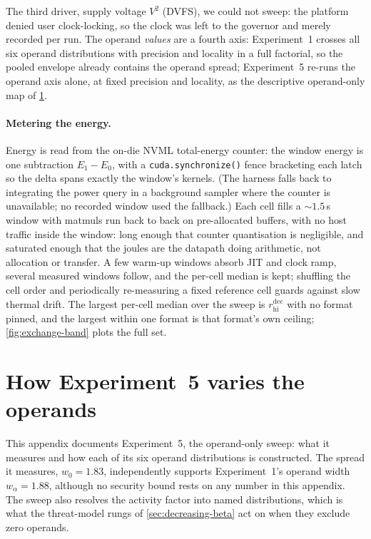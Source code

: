 \documentclass{article}
\theoremstyle{plain}
\theoremstyle{definition}
\theoremstyle{remark}
\begin{document}
The third driver, supply voltage $V^2$ (DVFS), we could not sweep: the
platform denied user clock-locking, so the clock was left to the governor
and merely recorded per run. The operand \emph{values} are a fourth axis:
Experiment~1 crosses all six operand distributions
with precision and locality in a full factorial, so the pooled envelope
already contains the operand spread; Experiment~5 re-runs the operand axis
alone, at fixed precision and locality, as the descriptive operand-only map
of \cref{app:operands}.

\paragraph{Metering the energy.}
Energy is read from the on-die NVML total-energy counter: the window energy
is one subtraction $E_1 - E_0$, with a \texttt{cuda.synchronize()} fence
bracketing each latch so the delta spans exactly the window's kernels.
(The harness falls back to integrating the power query in a background
sampler where the counter is unavailable; no recorded window used the
fallback.) Each cell fills a ${\sim}1.5$\,s window with matmuls
run back to back on pre-allocated buffers, with no host traffic inside the
window: long enough that counter quantisation is negligible, and saturated
enough that the joules are the datapath doing arithmetic, not allocation or
transfer. A few warm-up windows absorb JIT and clock ramp, several measured
windows follow, and the per-cell median is kept; shuffling the cell order
and periodically re-measuring a fixed reference cell guards against slow
thermal drift. The largest per-cell median over the sweep is
$r_{\mathrm{hi}}^{\mathrm{dec}}$ with no format pinned, and the largest within
one format is that format's own ceiling;
\cref{fig:exchange-band} plots the full set.

\section{How Experiment~5 varies the operands}
\label{app:operands}

This appendix documents Experiment~5, the operand-only sweep: what it
measures and how each of its six operand distributions is constructed. The spread it measures,
$w_0 = 1.83$, independently supports Experiment~1's operand width
$w_\alpha = 1.88$, although no security bound rests on any number in this
appendix. The sweep also resolves the activity factor into named
distributions, which is what the threat-model rungs of
\cref{sec:decreasing-beta} act on when they exclude zero operands.
\end{document}

